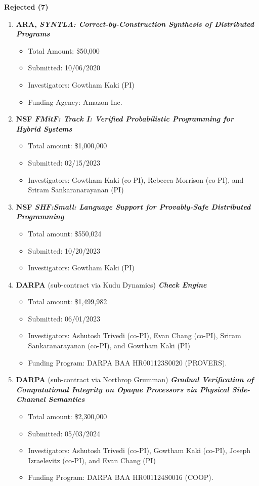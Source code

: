 \documentclass{article}
\begin{document}
\noindent\textbf{Rejected (7)}
\begin{enumerate}
\item {\bf ARA, \emph{SYNTLA: Correct-by-Construction Synthesis of Distributed Programs}}
  \begin{itemize}
    \item 
      Total Amount: \$50,000
    \item 
      Submitted: 10/06/2020
    \item 
      Investigators: Gowtham Kaki (PI)
    \item 
      Funding Agency: Amazon Inc.
  \end{itemize}


\item {\bf NSF \emph{FMitF: Track I: Verified Probabilistic Programming for Hybrid Systems}} 
  \begin{itemize}
  \item
    Total amount: \$1,000,000
  \item 
    Submitted: 02/15/2023
  \item Investigators: Gowtham Kaki (co-PI), Rebecca Morrison (co-PI), and
  Sriram Sankaranarayanan (PI)
  \end{itemize}

\item {\bf NSF \emph{SHF:Small: Language Support for Provably-Safe Distributed Programming}} 
  \begin{itemize}
  \item
    Total amount: \$550,024
  \item  
    Submitted: 10/20/2023 
  \item 
    Investigators: Gowtham Kaki (PI)  
  \end{itemize}

\item {\bf DARPA} (sub-contract via Kudu Dynamics) {\bf\emph{Check Engine}} 
  \begin{itemize}
  \item
    Total amount: \$1,499,982
  \item  
    Submitted: 06/01/2023 
  \item 
    Investigators: Ashutosh Trivedi (co-PI), Evan Chang (co-PI), Sriram
    Sankaranarayanan (co-PI), and Gowtham Kaki (PI)
  \item 
      Funding Program: DARPA BAA HR001123S0020 (PROVERS).  
  \end{itemize}

\item {\bf DARPA} (sub-contract via Northrop Grumman) {\bf\emph{Gradual Verification of Computational Integrity on Opaque Processors via Physical Side-Channel Semantics}} 
  \begin{itemize}
  \item
    Total amount: \$2,300,000
  \item  
    Submitted: 05/03/2024 
  \item 
    Investigators: Ashutosh Trivedi (co-PI), Gowtham Kaki (co-PI), Joseph
    Izraelevitz (co-PI), and Evan Chang (PI)
  \item 
      Funding Program: DARPA BAA HR001124S0016 (COOP).  
  \end{itemize}  
  

\end{enumerate}
\end{document}

